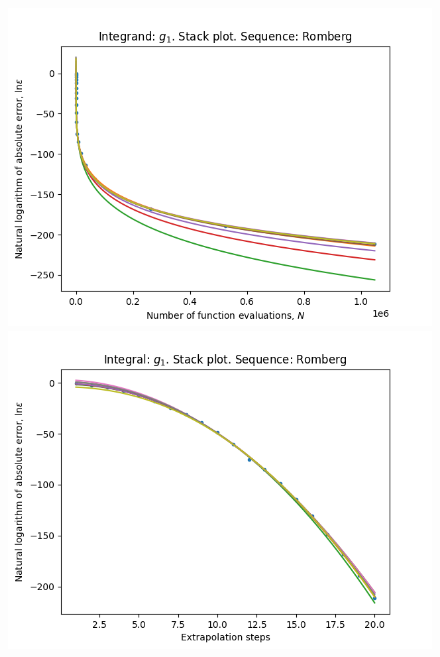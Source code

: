 \begin{figure}[H]
\centering
\begin{minipage}{0.45\textwidth}
\centering
\includegraphics[scale=0.45]{../results/romberg_plots/g_one_hp_romberg_stack.png}
\end{minipage}
\begin{minipage}{0.45\textwidth}
\centering
\includegraphics[scale=0.45]{../results/romberg_plots/g_one_hp_romberg_steps_stack.png}
\end{minipage}
\end{figure}

